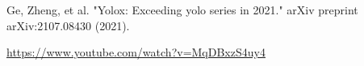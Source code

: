 \documentclass[lettersize,journal]{IEEEtran}
\begin{document}
\begin{thebibliography}{1}


  Ge, Zheng, et al. "Yolox: Exceeding yolo series in 2021." arXiv preprint arXiv:2107.08430 (2021).

  \url{https://www.youtube.com/watch?v=MqDBxzS4uy4}

\end{thebibliography}

\vfill
\end{document}
